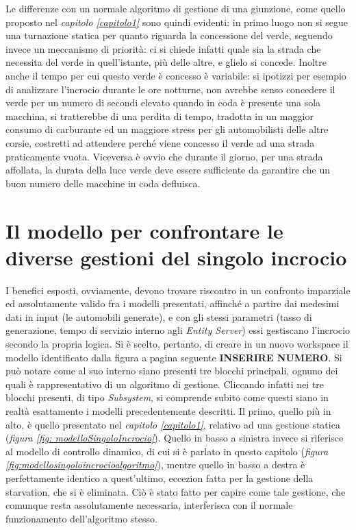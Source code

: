 Le differenze con un normale algoritmo di gestione di una giunzione, come quello proposto nel \textit{capitolo \ref{capitolo1}} sono quindi evidenti: in primo luogo non si segue una turnazione statica per quanto riguarda la concessione del verde, seguendo invece un meccanismo di priorità: ci si chiede infatti quale sia la strada che necessita del verde in quell'istante, più delle altre, e glielo si concede. Inoltre anche il tempo per cui questo verde è concesso è variabile: si ipotizzi per esempio di analizzare l'incrocio durante le ore notturne, non avrebbe senso concedere il verde per un numero di secondi elevato quando in coda è presente una sola macchina, si tratterebbe di una perdita di tempo, tradotta in un maggior consumo di carburante ed un maggiore stress per gli automobilisti delle altre corsie, costretti ad attendere perché viene concesso il verde ad una strada praticamente vuota. Viceversa è ovvio che durante il giorno, per una strada affollata, la durata della luce verde deve essere sufficiente da garantire che un buon numero delle macchine in coda defluisca.
\newpage

\section{Il modello per confrontare le diverse gestioni del singolo incrocio}

I benefici esposti, ovviamente, devono trovare riscontro in un confronto imparziale ed assolutamente valido fra i modelli presentati, affinché a partire dai medesimi dati in input (le automobili generate), e con gli stessi parametri (tasso di generazione, tempo di servizio interno agli \textit{Entity Server}) essi gestiscano l'incrocio secondo la propria logica. Si è scelto, pertanto, di creare in un nuovo workspace il modello identificato dalla figura a pagina seguente \textbf{INSERIRE NUMERO}. Si può notare come al suo interno siano presenti tre blocchi principali, ognuno dei quali è rappresentativo di un algoritmo di gestione. Cliccando infatti nei tre blocchi presenti, di tipo \textit{Subsystem}, si comprende subito come questi siano in realtà esattamente i modelli precedentemente descritti. Il primo, quello più in alto, è quello presentato nel \textit{capitolo \ref{capitolo1}}, relativo ad una gestione statica (\textit{figura \ref{fig: modelloSingoloIncrocio}}). Quello in basso a sinistra invece si riferisce al modello di controllo dinamico, di cui si è parlato in questo capitolo (\textit{figura \ref{fig:modellosingoloincrocioalgoritmo}}), mentre quello in basso a destra è perfettamente identico a quest'ultimo, eccezion fatta per la gestione della starvation, che si è eliminata. Ciò è stato fatto per capire come tale gestione, che comunque resta assolutamente necessaria, interferisca con il normale funzionamento dell'algoritmo stesso.

